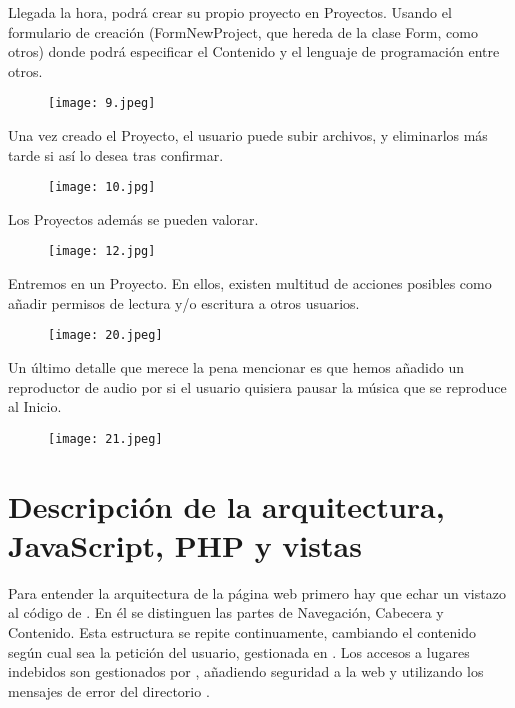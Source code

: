 \documentclass[12pt]{report}
\begin{document}
Llegada la hora, podrá crear su propio proyecto en Proyectos. Usando el formulario de creación (FormNewProject, que hereda de la clase Form, como otros) donde podrá especificar el Contenido y el lenguaje de programación entre otros.

\begin{figure}[!h]
 \centering
  \texttt{[image: 9.jpeg]}
\end{figure}

Una vez creado el Proyecto, el usuario puede subir archivos, y eliminarlos más tarde si así lo desea tras confirmar. 

\begin{figure}[!h]
 \centering
  \texttt{[image: 10.jpg]}
\end{figure}

Los Proyectos además se pueden valorar.

\begin{figure}[!h]
 \centering
  \texttt{[image: 12.jpg]}
\end{figure}

Entremos en un Proyecto. En ellos, existen multitud de acciones posibles como añadir permisos de lectura y/o escritura a otros usuarios.

\begin{figure}[!h]
 \centering
  \texttt{[image: 20.jpeg]}
\end{figure}

Un último detalle que merece la pena mencionar es que hemos añadido un reproductor de audio por si el usuario quisiera pausar la música que se reproduce al Inicio.

\begin{figure}[!h]
 \centering
  \texttt{[image: 21.jpeg]}
\end{figure}


\section{Descripción de la arquitectura, JavaScript, PHP y vistas}

Para entender la arquitectura de la página web primero hay que echar un vistazo al código de . En él se distinguen las partes de Navegación, Cabecera y Contenido. Esta estructura se repite continuamente, cambiando el contenido según cual sea la petición del usuario, gestionada en . Los accesos a lugares indebidos son gestionados por , añadiendo seguridad a la web y utilizando los mensajes de error del directorio .
\end{document}
